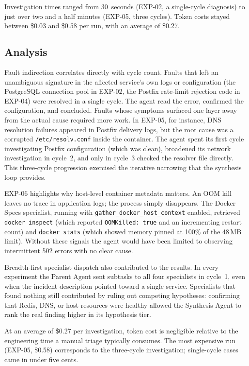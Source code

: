 \documentclass[conference]{IEEEtran}
\begin{document}
Investigation times ranged from 30~seconds (EXP-02, a single-cycle
diagnosis) to just over two and a half minutes (EXP-05, three
cycles). Token costs stayed between \$0.03 and \$0.58 per run, with
an average of \$0.27.

\subsection{Analysis}

Fault indirection correlates directly with cycle count. Faults that left an unambiguous
signature in the affected service's own logs or configuration
(the PostgreSQL connection pool in EXP-02, the Postfix rate-limit
rejection code in EXP-04) were resolved in a single cycle. The
agent read the error, confirmed the configuration, and concluded.
Faults whose symptoms surfaced one layer away from the actual cause
required more work. In EXP-05, for instance, DNS resolution failures
appeared in Postfix delivery logs, but the root cause was a corrupted
\texttt{/etc/resolv.conf} inside the container. The agent spent its
first cycle investigating Postfix configuration (which was clean),
broadened its network investigation in cycle~2, and only in cycle~3
checked the resolver file directly. This three-cycle progression exercised the iterative narrowing
that the synthesis loop provides.

EXP-06 highlights why host-level container metadata matters. An OOM
kill leaves no trace in application logs; the process simply
disappears. The Docker Specs specialist, running with
\texttt{gather\_docker\_host\_context} enabled, retrieved
\texttt{docker inspect} (which reported \texttt{OOMKilled:~true} and
an incrementing restart count) and \texttt{docker stats} (which
showed memory pinned at 100\% of the 48\,MB limit). Without these
signals the agent would have been limited to observing intermittent
502 errors with no clear cause.

Breadth-first specialist dispatch also contributed to the results. In
every experiment the Parent Agent sent subtasks to all four
specialists in cycle~1, even when the incident description pointed
toward a single service. Specialists that found nothing still
contributed by ruling out competing hypotheses: confirming that
Redis, DNS, or host resources were healthy allowed the Synthesis
Agent to rank the real finding higher in its hypothesis tier.

At an average of \$0.27 per investigation, token cost is
negligible relative to the engineering time a manual triage
typically consumes. The most expensive run (EXP-05, \$0.58)
corresponds to the three-cycle investigation; single-cycle cases
came in under five cents.
\end{document}
